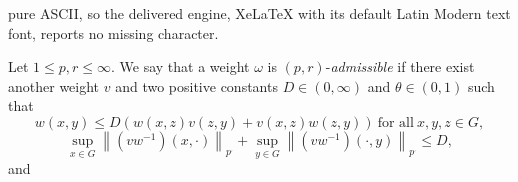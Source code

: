 \documentclass[10pt,a4paper]{amsart}
\begin{document}
pure ASCII, so the delivered engine, XeLaTeX with its default Latin Modern text font, reports no missing character.
	\begin{definition}
		Let $1\le p,r\le \infty$. We say that a weight $\omega $ is $\left (p,r  \right ) $-{\it admissible} if there exist another weight $v$ and two positive constants $D\in \left ( 0,\infty  \right ) $ and
		$ \theta \in \left ( 0,1 \right ) $ such that
		\begin{equation}\label{w1}
			w\left ( x,y \right ) \le  D\left ( w\left ( x,z \right ) v\left ( z,y \right ) +v\left ( x,z \right ) w\left ( z,y \right )  \right )~\text{for~all}~ x,y,z\in G,
		\end{equation}
		\begin{equation}\label{w22}
			\sup_{x\in G}\left \| (vw^{-1})\left ( x,\cdot \right ) \right \|_{p^{_{'}}} +\sup_{y\in G}\left \|( vw^{-1})\left ( \cdot,y \right ) \right \| _{p^{_{'}}}\le D,
		\end{equation}
		and
		\begin{equation}\label{w2}

\end{equation}
\end{definition}
\end{document}
